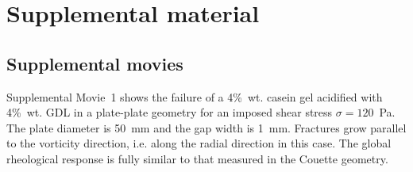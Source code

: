 \documentclass[twocolumn,superscriptaddress,showpacs,preprintnumbers,amsmath,amssymb,prl]{revtex4}
\begin{document}
\begin{thebibliography}{}













\end{thebibliography}

\clearpage
\newpage
\setcounter{figure}{0}

\section*{\large Supplemental material}

\subsection*{Supplemental movies}

Supplemental Movie~1 shows the failure of a 4\%~wt. casein gel acidified with 4\%~wt. GDL in a plate-plate geometry for an imposed shear stress $\sigma=120$~Pa. The plate diameter is 50~mm and the gap width is 1~mm. Fractures grow parallel to the vorticity direction, i.e. along the radial direction in this case. The global rheological response is fully similar to that measured in the Couette geometry.
\end{document}
